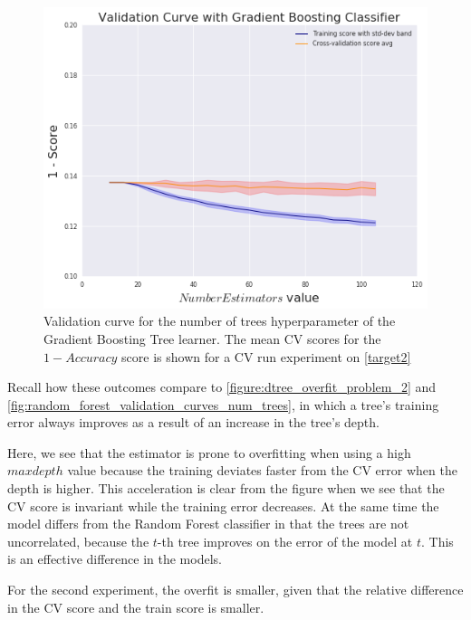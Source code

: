 \begin{figure}[h!]
    \begin{center}
        \includegraphics[width=1\linewidth]{figures/gradient-boosting/validation_curve_boosting_num_trees_series_f1}
            \caption{ Validation curve for the number of trees hyperparameter of the Gradient Boosting Tree learner. The mean CV scores for the $1 - Accuracy$ score is shown for a CV run experiment on \cref{target2}}
            \label{fig:boosting_validation_curves_num_trees}
    \end{center}
\end{figure}


Recall how these outcomes compare to \cref{figure:dtree_overfit_problem_2} and \cref{fig:random_forest_validation_curves_num_trees},
in which a tree's training error always improves as a result of an increase in the tree's depth.

Here, we see that the estimator is prone to overfitting when using a high $max depth$ value because the training deviates faster from the CV error when the depth is higher.
This acceleration is clear from the figure when we see that the CV score is invariant while the training error decreases.
At the same time the model differs from the Random Forest classifier in that the trees are not uncorrelated, because the $t$-th tree improves on the error of the model at $t$.
This is an effective difference in the models.

For the second experiment, the overfit is smaller, given that the relative difference in the CV score and the train score is smaller.

